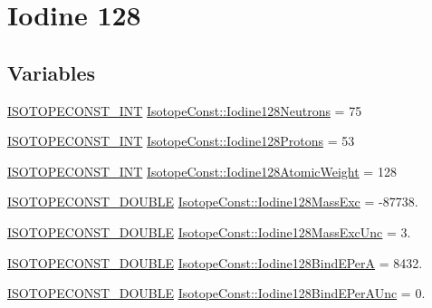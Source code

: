 \hypertarget{group___isotope_const-_iodine-_i128}{}\section{Iodine 128}
\label{group___isotope_const-_iodine-_i128}
\subsection*{Variables}
\begin{DoxyCompactItemize}
\item 
\mbox{\hyperlink{group___isotope_const-_macros_ga5f18360b3e99483a35c32d789e62621c}{I\+S\+O\+T\+O\+P\+E\+C\+O\+N\+S\+T\+\_\+\+I\+NT}} \mbox{\hyperlink{group___isotope_const-_iodine-_i128_ga2bcd2a55abafe501f8baddb03d766255}{Isotope\+Const\+::\+Iodine128\+Neutrons}} = 75
\item 
\mbox{\hyperlink{group___isotope_const-_macros_ga5f18360b3e99483a35c32d789e62621c}{I\+S\+O\+T\+O\+P\+E\+C\+O\+N\+S\+T\+\_\+\+I\+NT}} \mbox{\hyperlink{group___isotope_const-_iodine-_i128_ga03545c2200860e8083a9c6d8e8bc28c4}{Isotope\+Const\+::\+Iodine128\+Protons}} = 53
\item 
\mbox{\hyperlink{group___isotope_const-_macros_ga5f18360b3e99483a35c32d789e62621c}{I\+S\+O\+T\+O\+P\+E\+C\+O\+N\+S\+T\+\_\+\+I\+NT}} \mbox{\hyperlink{group___isotope_const-_iodine-_i128_gaeceaf87c438acd5b28fbcb6d3d08fbc3}{Isotope\+Const\+::\+Iodine128\+Atomic\+Weight}} = 128
\item 
\mbox{\hyperlink{group___isotope_const-_macros_ga8f45a7272ce02c0b4c65c44636ed719a}{I\+S\+O\+T\+O\+P\+E\+C\+O\+N\+S\+T\+\_\+\+D\+O\+U\+B\+LE}} \mbox{\hyperlink{group___isotope_const-_iodine-_i128_ga4995a00567307caa269bcfe7ed7435d7}{Isotope\+Const\+::\+Iodine128\+Mass\+Exc}} = -\/87738.
\item 
\mbox{\hyperlink{group___isotope_const-_macros_ga8f45a7272ce02c0b4c65c44636ed719a}{I\+S\+O\+T\+O\+P\+E\+C\+O\+N\+S\+T\+\_\+\+D\+O\+U\+B\+LE}} \mbox{\hyperlink{group___isotope_const-_iodine-_i128_ga91d5e8cf6d28e10ca6cc5007e8790d80}{Isotope\+Const\+::\+Iodine128\+Mass\+Exc\+Unc}} = 3.
\item 
\mbox{\hyperlink{group___isotope_const-_macros_ga8f45a7272ce02c0b4c65c44636ed719a}{I\+S\+O\+T\+O\+P\+E\+C\+O\+N\+S\+T\+\_\+\+D\+O\+U\+B\+LE}} \mbox{\hyperlink{group___isotope_const-_iodine-_i128_gad2bb61a5c68c9ecef3f3444a5e594c6c}{Isotope\+Const\+::\+Iodine128\+Bind\+E\+PerA}} = 8432.
\item 
\mbox{\hyperlink{group___isotope_const-_macros_ga8f45a7272ce02c0b4c65c44636ed719a}{I\+S\+O\+T\+O\+P\+E\+C\+O\+N\+S\+T\+\_\+\+D\+O\+U\+B\+LE}} \mbox{\hyperlink{group___isotope_const-_iodine-_i128_ga51d0b5874796eb53bc7f9ef9aac3bb8b}{Isotope\+Const\+::\+Iodine128\+Bind\+E\+Per\+A\+Unc}} = 0.

\end{DoxyCompactItemize}
